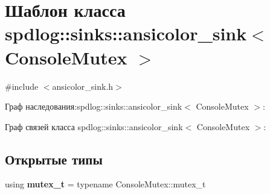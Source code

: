 \hypertarget{classspdlog_1_1sinks_1_1ansicolor__sink}{}\section{Шаблон класса spdlog\+:\+:sinks\+:\+:ansicolor\+\_\+sink$<$ Console\+Mutex $>$}
\label{classspdlog_1_1sinks_1_1ansicolor__sink}


{\ttfamily \#include $<$ansicolor\+\_\+sink.\+h$>$}



Граф наследования\+:spdlog\+:\+:sinks\+:\+:ansicolor\+\_\+sink$<$ Console\+Mutex $>$\+:


Граф связей класса spdlog\+:\+:sinks\+:\+:ansicolor\+\_\+sink$<$ Console\+Mutex $>$\+:
\subsection*{Открытые типы}
\begin{DoxyCompactItemize}
\item 
\mbox{\label{classspdlog_1_1sinks_1_1ansicolor__sink_a8841639ce6013b9553fe1d27c13e4c69}} 
using {\bfseries mutex\+\_\+t} = typename Console\+Mutex\+::mutex\+\_\+t
\end{DoxyCompactItemize}
